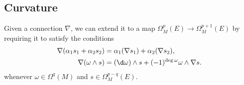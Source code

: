 \documentclass[a4paper]{article}
\begin{document}
%
%
%
%
%

\subsection{Curvature}
Given a connection $\nabla$, we can extend it to a map $\Omega^p_M(E) \to \Omega^{p + 1}_M(E)$ by requiring it to satisfy the conditions
\begin{align*}
  \nabla (\alpha_1 s_1 + \alpha_2 s_2) &= \alpha_1( \nabla s_1) + \alpha_2 (\nabla s_2),\\
  \nabla (\omega \wedge s) &= (\d \omega) \wedge s + (-1)^{\deg \omega} \omega \wedge \nabla s.
\end{align*}
whenever $\omega \in \Omega^q(M)$ and $s \in \Omega_M^{p - q}(E)$.
\end{document}
